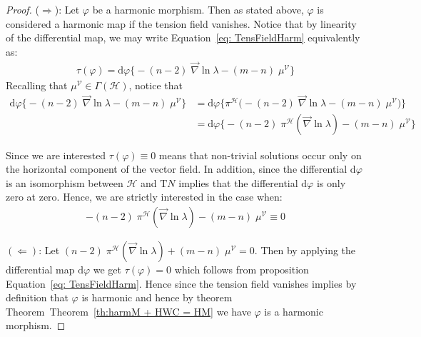 \documentclass[12pt]{article}
\newcommand{\diff}{\text{d}}
\theoremstyle{definition}
\numberwithin{equation}{subsection}
\begin{document}
\begin{proof}
($\Rightarrow$): Let $\varphi$ be a harmonic morphism. Then as stated above, $\varphi$ is considered a harmonic map if the tension field vanishes. Notice that by linearity of the differential map, we may write Equation~\ref{eq: TensFieldHarm} equivalently as:
\begin{align*}
\tau(\varphi) = \diff \varphi \Big\{-(n -2)\;  \vec{\nabla} \ln \lambda - (m - n)\;  \mu^\mathcal{V} \Big\}
\end{align*}
Recalling that $\mu^\mathcal{V} \in \Gamma({\mathcal{H}})$, notice that
\begin{align*}
     \diff \varphi \Big\{-(n -2)\;  \vec{\nabla} \ln \lambda  - (m - n)\;  \mu^\mathcal{V} \Big\} &=  \diff \varphi \Big\{ \pi^\mathcal{H} \Big(-(n -2)\;  \vec{\nabla} \ln \lambda  - (m - n)\;  \mu^\mathcal{V} \Big) \Big\} \\
     &=  \diff \varphi \Big\{-(n -2)\; \pi^\mathcal{H} (\vec{\nabla} \ln \lambda ) - (m - n)\;  \mu^\mathcal{V} \Big\}
\end{align*}

Since we are interested $\tau(\varphi) \equiv 0$ means that non-trivial solutions occur only on the horizontal component of the vector field. In addition, since the differential $\diff \varphi$ is an isomorphism between $\mathcal{H}$ and $\text{T}N$ implies that the differential $\diff \varphi$ is only zero at zero. Hence, we are strictly interested in the case when:
\begin{align*}
    -(n -2)\; \pi^\mathcal{H} (\vec{\nabla} \ln \lambda ) - (m - n)\;  \mu^\mathcal{V} \equiv 0
\end{align*}

$(\Leftarrow)$: Let $ (n -2)\; \pi^\mathcal{H} (\vec{\nabla} \ln \lambda ) + (m - n)\;  \mu^\mathcal{V} = 0$. Then by applying the differential map $\diff \varphi$ we get $\tau(\varphi) =0$ which follows from proposition Equation~\ref{eq: TensFieldHarm}. Hence since the tension field vanishes implies by definition that $\varphi$ is harmonic and hence by theorem Theorem~Theorem~\ref{th:harmM + HWC = HM} we have $\varphi$ is a harmonic morphism. 

\end{proof}
\end{document}

